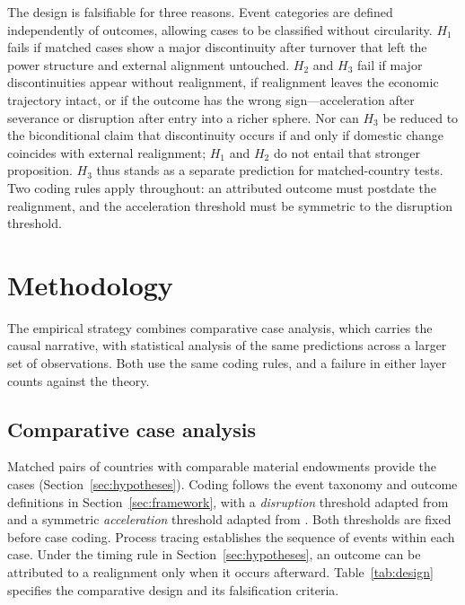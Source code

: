 \documentclass[11pt]{article}
\begin{document}
The design is falsifiable for three reasons. Event categories are defined independently of outcomes, allowing cases to be classified without circularity. $H_1$ fails if matched cases show a major discontinuity after turnover that left the power structure and external alignment untouched. $H_2$ and $H_3$ fail if major discontinuities appear without realignment, if realignment leaves the economic trajectory intact, or if the outcome has the wrong sign---acceleration after severance or disruption after entry into a richer sphere. Nor can $H_3$ be reduced to the biconditional claim that discontinuity occurs if and only if domestic change coincides with external realignment; $H_1$ and $H_2$ do not entail that stronger proposition. $H_3$ thus stands as a separate prediction for matched-country tests. Two coding rules apply throughout: an attributed outcome must postdate the realignment, and the acceleration threshold must be symmetric to the disruption threshold.

\section{Methodology}
\label{sec:methodology}

The empirical strategy combines comparative case analysis, which carries the causal narrative, with statistical analysis of the same predictions across a larger set of observations. Both use the same coding rules, and a failure in either layer counts against the theory.

\subsection{Comparative case analysis}

Matched pairs of countries with comparable material endowments provide the cases (Section~\ref{sec:hypotheses}). Coding follows the event taxonomy and outcome definitions in Section~\ref{sec:framework}, with a \emph{disruption} threshold adapted from \textcite{rodrik_1999} and a symmetric \emph{acceleration} threshold adapted from \textcite{hausmann_pritchett_rodrik_2005}. Both thresholds are fixed before case coding. Process tracing establishes the sequence of events within each case. Under the timing rule in Section~\ref{sec:hypotheses}, an outcome can be attributed to a realignment only when it occurs afterward. Table~\ref{tab:design} specifies the comparative design and its falsification criteria.
\end{document}
